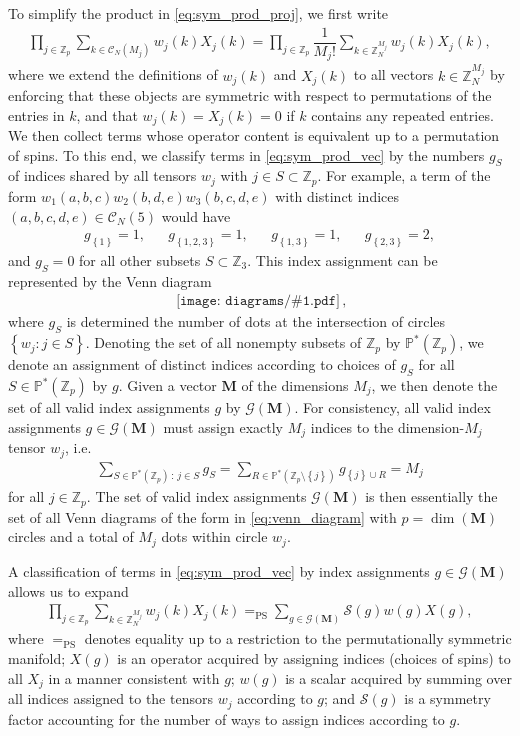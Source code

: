 \documentclass[nofootinbib,notitlepage,11pt]{revtex4-2}
\newcommand{\f}[2]{\dfrac{#1}{#2}} %
\newcommand{\p}[1]{\left(#1\right)} %
\renewcommand{\set}[1]{\left\{#1\right\}} %
\newcommand{\m}{\bm} %
\newcommand{\1}{\mathds{1}}
\newcommand{\C}{\mathcal{C}}
\newcommand{\G}{\mathcal{G}}
\renewcommand{\S}{\mathcal{S}}
\newcommand{\PP}{\mathbb{P}}
\newcommand{\ZZ}{\mathbb{Z}}
\newcommand{\EQPS}{=_{\text{PS}}}
\newcommand{\diagram}[1]
{\,\texttt{[image: diagrams/\#1.pdf]}\,}
\begin{document}
To simplify the product in \eqref{eq:sym_prod_proj}, we first write
\begin{align}
  \prod_{j\in\ZZ_p} \sum_{k\in\C_N\p{M_j}} w_j\p{k} X_j\p{k}
  = \prod_{j\in\ZZ_p} \f1{M_j!} \sum_{k\in\ZZ_N^{M_j}}
  w_j\p{k} X_j\p{k},
  \label{eq:sym_prod_vec}
\end{align}
where we extend the definitions of $w_j\p{k}$ and $X_j\p{k}$ to all
vectors $k\in\ZZ_N^{M_j}$ by enforcing that these objects are
symmetric with respect to permutations of the entries in $k$, and that
$w_j\p{k}=X_j\p{k}=0$ if $k$ contains any repeated entries.  We then
collect terms whose operator content is equivalent up to a permutation
of spins.  To this end, we classify terms in \eqref{eq:sym_prod_vec}
by the numbers $g_S$ of indices shared by all tensors $w_j$ with
$j\in S\subset\ZZ_p$.  For example, a term of the form
$w_1\p{a,b,c} w_2\p{b,d,e} w_3\p{b,c,d,e}$ with distinct indices
$\p{a,b,c,d,e}\in\C_N\p{5}$ would have
\begin{align}
  g_{\set{1}} = 1,
  &&
  g_{\set{1,2,3}} = 1,
  &&
  g_{\set{1,3}} = 1,
  &&
  g_{\set{2,3}} = 2,
\end{align}
and $g_S=0$ for all other subsets $S\subset\ZZ_3$.  This index
assignment can be represented by the Venn diagram
\begin{align}
  \diagram{example_123},
  \label{eq:venn_diagram}
\end{align}
where $g_S$ is determined the number of dots at the intersection of
circles $\set{w_j:j\in S}$.  Denoting the set of all nonempty subsets
of $\ZZ_p$ by $\PP^*\p{\ZZ_p}$, we denote an assignment of distinct
indices according to choices of $g_S$ for all $S\in\PP^*\p{\ZZ_p}$ by
$g$.  Given a vector $\m M$ of the dimensions $M_j$, we then denote
the set of all valid index assignments $g$ by $\G\p{\m M}$.  For
consistency, all valid index assignments $g\in\G\p{\m M}$ must assign
exactly $M_j$ indices to the dimension-$M_j$ tensor $w_j$, i.e.~
\begin{align}
  \sum_{S\in\PP^*\p{\ZZ_p}\,:\,j\in S} g_S
  = \sum_{R\in\PP^*\p{\ZZ_p\setminus\set{j}}} g_{\set{j}\cup R}
  = M_j
\end{align}
for all $j\in\ZZ_p$.  The set of valid index assignments $\G\p{\m M}$
is then essentially the set of all Venn diagrams of the form in
\eqref{eq:venn_diagram} with $p=\dim\p{\m M}$ circles and a total of
$M_j$ dots within circle $w_j$.

A classification of terms in \eqref{eq:sym_prod_vec} by index
assignments $g\in\G\p{\m M}$ allows us to expand
\begin{align}
  \prod_{j\in\ZZ_p} \sum_{k\in\ZZ_N^{M_j}} w_j\p{k} X_j\p{k}
  \EQPS \sum_{g\in\G\p{\m M}} \S\p{g} w\p{g} X\p{g},
  \label{eq:sym_prod_group_start}
\end{align}
where $\EQPS$ denotes equality up to a restriction to the
permutationally symmetric manifold; $X\p{g}$ is an operator acquired
by assigning indices (choices of spins) to all $X_j$ in a manner
consistent with $g$; $w\p{g}$ is a scalar acquired by summing over all
indices assigned to the tensors $w_j$ according to $g$; and $\S\p{g}$
is a symmetry factor accounting for the number of ways to assign
indices according to $g$.
\end{document}
